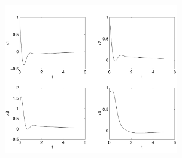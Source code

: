 \documentclass{ximera}
\begin{document}
\begin{computerExercise}
\begin{solution}
\begin{figure}[htb]
                       \centerline{%
                       \includegraphics[width=3.0in]{exfigure/11-3-1a.pdf}}
\end{figure}

\end{solution}
\end{computerExercise}
\end{document}
